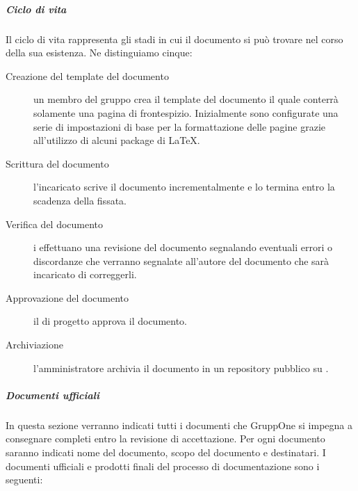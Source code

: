 \documentclass[../../norme-di-progetto.tex]{subfiles}
\begin{document}
\subparagraph{Ciclo di vita}%
\label{par:ciclo_di_vita}
Il ciclo di vita rappresenta gli stadi in cui il documento si può trovare nel corso della sua esistenza. Ne distinguiamo cinque:

\begin{description}
  \item [Creazione del template del documento] un membro del gruppo crea il template del documento il quale conterrà solamente una pagina di frontespizio. Inizialmente sono configurate una serie di impostazioni di base per la formattazione delle pagine grazie all'utilizzo di alcuni package di \LaTeX.
  \item [Scrittura del documento] l'incaricato scrive il documento incrementalmente e lo termina entro la scadenza della  fissata.
  \item [Verifica del documento] i  effettuano una revisione del documento segnalando eventuali errori o discordanze che verranno segnalate all'autore del documento che sarà incaricato di correggerli.
  \item [Approvazione del documento] il  di progetto approva il documento.
  \item [Archiviazione] l'amministratore archivia il documento in un repository pubblico su .
\end{description}

\subparagraph{Documenti ufficiali}%
\label{subp:documenti_ufficiali}

In questa sezione verranno indicati tutti i documenti che GruppOne si impegna a consegnare completi entro la revisione di accettazione. Per ogni documento saranno indicati nome del documento, scopo del documento e destinatari.
I documenti ufficiali e prodotti finali del processo di documentazione sono i seguenti:
\end{document}
